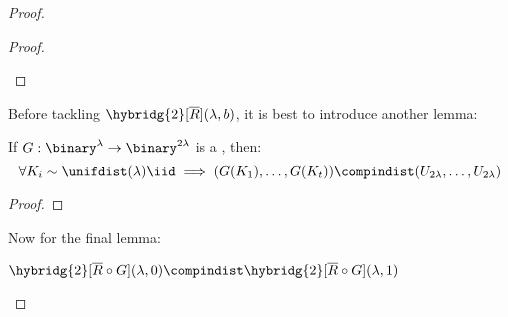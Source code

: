 \begin{proof}
\begin{proof}
\begin{cryptoredux}

            \cseqbeginloop



            \cseqdelay


            \cseqendloop



        \end{cryptoredux}

    \end{proof}

    Before tackling $\hybridg{2}[\overline{R}](\lambda, b)$, it is best to introduce another lemma:

    \begin{lemma}
        If $G : \binary^\lambda \to \binary^{2 \lambda}$ is a \prg, then:
        \[
            \forall K_i \sim \unifdist(\lambda) \iid \implies (G(K_1), \dots , G(K_t)) \compindist (U_{2 \lambda}, \dots , U_{2\lambda})
        \]
    \end{lemma}

    \begin{proof}
    \end{proof}

    Now for the final lemma:

    \begin{lemma}
        $\hybridg{2}[\overline{R} \circ G](\lambda, 0) \compindist \hybridg{2}[\overline{R} \circ G](\lambda, 1)$       
    \end{lemma}
    

\end{proof}

